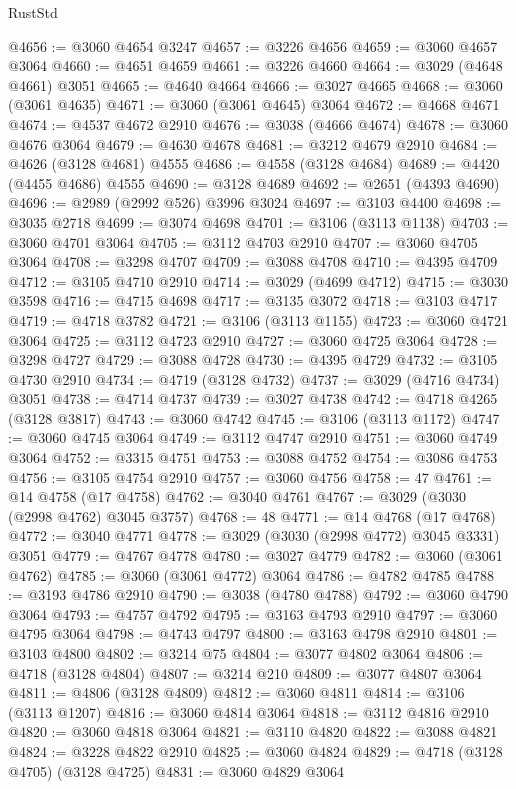 \begin{lexlean}{RustStd}
\begin{coremodule}
@4656 := @3060 @4654 @3247
@4657 := @3226 @4656
@4659 := @3060 @4657 @3064
@4660 := @4651 @4659
@4661 := @3226 @4660
@4664 := @3029 (@4648 @4661) @3051
@4665 := @4640 @4664
@4666 := @3027 @4665
@4668 := @3060 (@3061 @4635)
@4671 := @3060 (@3061 @4645) @3064
@4672 := @4668 @4671
@4674 := @4537 @4672 @2910
@4676 := @3038 (@4666 @4674)
@4678 := @3060 @4676 @3064
@4679 := @4630 @4678
@4681 := @3212 @4679 @2910
@4684 := @4626 (@3128 @4681) @4555
@4686 := @4558 (@3128 @4684)
@4689 := @4420 (@4455 @4686) @4555
@4690 := @3128 @4689
@4692 := @2651 (@4393 @4690)
@4696 := @2989 (@2992 @526) @3996 @3024
@4697 := @3103 @4400
@4698 := @3035 @2718
@4699 := @3074 @4698
@4701 := @3106 (@3113 @1138)
@4703 := @3060 @4701 @3064
@4705 := @3112 @4703 @2910
@4707 := @3060 @4705 @3064
@4708 := @3298 @4707
@4709 := @3088 @4708
@4710 := @4395 @4709
@4712 := @3105 @4710 @2910
@4714 := @3029 (@4699 @4712)
@4715 := @3030 @3598
@4716 := @4715 @4698
@4717 := @3135 @3072
@4718 := @3103 @4717
@4719 := @4718 @3782
@4721 := @3106 (@3113 @1155)
@4723 := @3060 @4721 @3064
@4725 := @3112 @4723 @2910
@4727 := @3060 @4725 @3064
@4728 := @3298 @4727
@4729 := @3088 @4728
@4730 := @4395 @4729
@4732 := @3105 @4730 @2910
@4734 := @4719 (@3128 @4732)
@4737 := @3029 (@4716 @4734) @3051
@4738 := @4714 @4737
@4739 := @3027 @4738
@4742 := @4718 @4265 (@3128 @3817)
@4743 := @3060 @4742
@4745 := @3106 (@3113 @1172)
@4747 := @3060 @4745 @3064
@4749 := @3112 @4747 @2910
@4751 := @3060 @4749 @3064
@4752 := @3315 @4751
@4753 := @3088 @4752
@4754 := @3086 @4753
@4756 := @3105 @4754 @2910
@4757 := @3060 @4756
@4758 := 47
@4761 := @14 @4758 (@17 @4758)
@4762 := @3040 @4761
@4767 := @3029 (@3030 (@2998 @4762) @3045 @3757)
@4768 := 48
@4771 := @14 @4768 (@17 @4768)
@4772 := @3040 @4771
@4778 := @3029 (@3030 (@2998 @4772) @3045 @3331) @3051
@4779 := @4767 @4778
@4780 := @3027 @4779
@4782 := @3060 (@3061 @4762)
@4785 := @3060 (@3061 @4772) @3064
@4786 := @4782 @4785
@4788 := @3193 @4786 @2910
@4790 := @3038 (@4780 @4788)
@4792 := @3060 @4790 @3064
@4793 := @4757 @4792
@4795 := @3163 @4793 @2910
@4797 := @3060 @4795 @3064
@4798 := @4743 @4797
@4800 := @3163 @4798 @2910
@4801 := @3103 @4800
@4802 := @3214 @75
@4804 := @3077 @4802 @3064
@4806 := @4718 (@3128 @4804)
@4807 := @3214 @210
@4809 := @3077 @4807 @3064
@4811 := @4806 (@3128 @4809)
@4812 := @3060 @4811
@4814 := @3106 (@3113 @1207)
@4816 := @3060 @4814 @3064
@4818 := @3112 @4816 @2910
@4820 := @3060 @4818 @3064
@4821 := @3110 @4820
@4822 := @3088 @4821
@4824 := @3228 @4822 @2910
@4825 := @3060 @4824
@4829 := @4718 (@3128 @4705) (@3128 @4725)
@4831 := @3060 @4829 @3064

\end{coremodule}
\end{lexlean}
